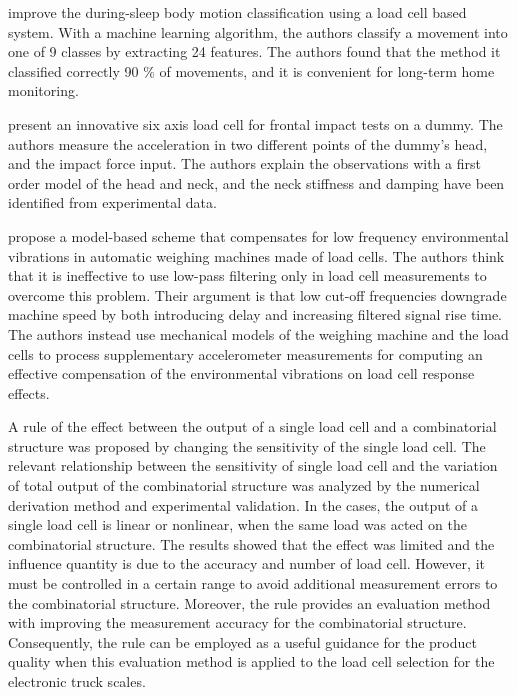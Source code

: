\documentclass[11pt]{article}
\begin{document}
\citet{Alaziz17} improve the during-sleep body motion classification using a load cell based system. With a machine learning algorithm, the authors classify a movement into one of 9 classes by extracting 24 features. The authors found that the method it classified correctly 90 \% of movements, and it is convenient for long-term home monitoring.

\citet{Ballo16}  present an innovative six axis load cell for frontal impact tests on a dummy.  The authors measure the acceleration in two different points of the dummy's head, and the impact force input. The authors explain the observations with a first order model of the head and neck, and the neck stiffness and damping have been identified from experimental data.

\citet{Boschetti13} propose a model-based scheme that compensates for low frequency environmental vibrations in automatic weighing machines made of load cells. The authors think that it is ineffective to use low-pass filtering only in load cell measurements to overcome this problem. Their argument is that low cut-off frequencies downgrade machine speed by both introducing delay and increasing filtered signal rise time. The authors instead use mechanical models of the weighing machine and the load cells to process supplementary accelerometer measurements for computing an effective compensation of the environmental vibrations on load cell response effects.

\citet{Guo18} A rule of the effect between the output of a single load cell and a combinatorial structure was proposed by changing the sensitivity of the single load cell. The relevant relationship between the sensitivity of single load cell and the variation of total output of the combinatorial structure was analyzed by the numerical derivation method and experimental validation. In the cases, the output of a single load cell is linear or nonlinear, when the same load was acted on the combinatorial structure. The results showed that the effect was limited and the influence quantity is due to the accuracy and number of load cell. However, it must be controlled in a certain range to avoid additional measurement errors to the combinatorial structure. Moreover, the rule provides an evaluation method with improving the measurement accuracy for the combinatorial structure. Consequently, the rule can be employed as a useful guidance for the product quality when this evaluation method is applied to the load cell selection for the electronic truck scales.
\end{document}
